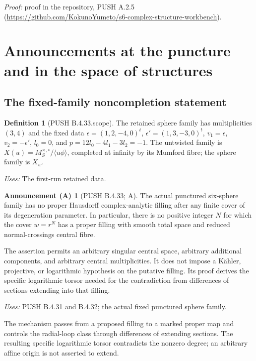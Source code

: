 \documentclass[11pt,a4paper]{article}
\theoremstyle{plain}
\theoremstyle{definition}
\newtheorem{announcement}[theorem]{Announcement (A)}
\newtheorem{definition}[theorem]{Definition}
\begin{document}
\noindent\emph{Proof:} proof in the repository, PUSH A.2.5 (\url{https://github.com/KokunoYumeto/s6-complex-structure-workbench}).

\section{Announcements at the puncture and in the space of structures}
\label{sec:announcements}
\subsection{The fixed-family noncompletion statement}
\begin{definition}[PUSH B.4.33.scope]\label{push:B.4.33.scope}
The retained sphere family has multiplicities $(3,4)$ and the fixed data
$\epsilon=(1,2,-4,0)^t$, $\epsilon'=(1,3,-3,0)^t$,
$v_1=\epsilon$, $v_2=-\epsilon'$, $l_0=0$, and $p=12l_0-4l_1-3l_2=-1$.
The untwisted family is
$X(u)=M_S^{\times,\circ}/\langle u\phi\rangle$, completed at infinity
by its Mumford fibre; the sphere family is $X_w$.
\end{definition}
\noindent\emph{Uses:} The first-run retained data.\par

\begin{announcement}[PUSH B.4.33; A]\label{push:B.4.33}
The actual punctured six-sphere family has no proper
Hausdorff complex-analytic filling after any finite
cover of its degeneration parameter. In particular,
there is no positive integer $N$ for which the cover
$w=r^N$ has a proper filling with smooth total space
and reduced normal-crossings central fibre.

The assertion permits an arbitrary singular central
space, arbitrary additional components, and arbitrary
central multiplicities. It does not impose a
K\"ahler, projective, or logarithmic hypothesis on
the putative filling. Its proof derives the specific
logarithmic torsor needed for the contradiction from
differences of sections extending into that filling.
\end{announcement}
\noindent\emph{Uses:} PUSH B.4.31 and B.4.32; the actual fixed punctured sphere family.\par

The mechanism passes from a proposed filling to a marked proper map and controls the radial-loop class through differences of extending sections. The resulting specific logarithmic torsor contradicts the nonzero degree; an arbitrary affine origin is not asserted to extend.
\end{document}
